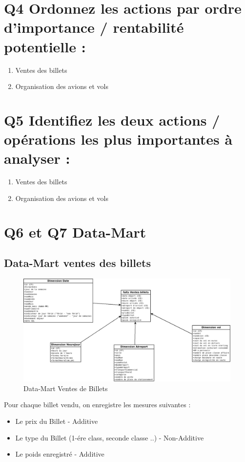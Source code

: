 \documentclass[oneside,13pt,a4paper]{article}
\begin{document}
\section{Q4 Ordonnez les actions par ordre d’importance / rentabilité potentielle : }
\begin{enumerate}
  \item Ventes des billets
  \item Organisation des avions et vols
\end{enumerate}

\section{Q5 Identifiez les deux actions / opérations les plus importantes à analyser : }

\begin{enumerate}
  \item Ventes des billets
  \item Organisation des avions et vols
\end{enumerate}

\section{Q6 et Q7 Data-Mart}

\subsection{Data-Mart ventes des billets}

\begin{figure}[h]
    \centering
    \includegraphics[width=1\textwidth]{img/VenteBillet.png}
    \caption{Data-Mart Ventes de Billets}
\end{figure}

Pour chaque billet vendu, on enregistre les mesures suivantes :
\begin{itemize}
  \item Le prix du Billet - Additive
  \item Le type du Billet (1-ére class, seconde classe ..) - Non-Additive
  \item Le poids enregistré - Additive
\end{itemize}
\end{document}
